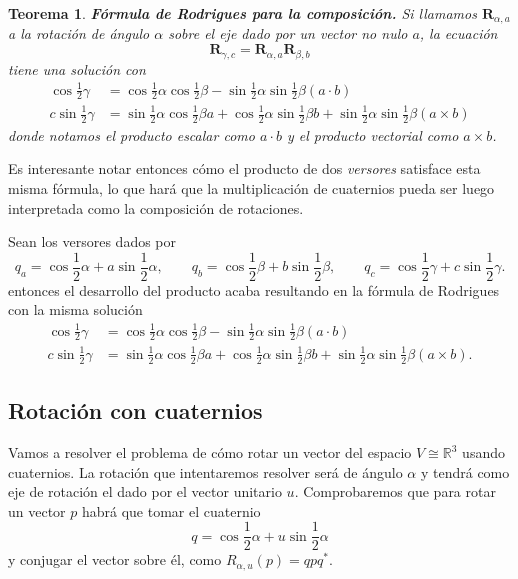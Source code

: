 \documentclass{article}
\theoremstyle{plain}
\newtheorem{theorem}{Teorema}
\theoremstyle{definition}
\theoremstyle{remark}
\begin{document}
\begin{theorem}
  \textbf{Fórmula de Rodrigues para la composición.} Si llamamos
  $\mathbf{R}_{\alpha,a}$ a la rotación de ángulo $\alpha$ sobre el
  eje dado por un vector no nulo $a$, la ecuación
  \[\mathbf{R}_{\gamma,c} =\mathbf{R}_{\alpha,a}\mathbf{R}_{\beta,b}\]
  tiene una solución con
  \[\begin{aligned}
    \cos \frac{1}{2}\gamma &=
    \cos \frac{1}{2}\alpha \cos\frac{1}{2}\beta - \sin\frac{1}{2}\alpha\sin\frac{1}{2}\beta (a\cdot b)\\
    c \sin \frac{1}{2}\gamma &=
    \sin \frac{1}{2}\alpha \cos\frac{1}{2}\beta a +
    \cos \frac{1}{2}\alpha \sin\frac{1}{2}\beta b +
    \sin \frac{1}{2}\alpha \sin\frac{1}{2}\beta (a \times b)
  \end{aligned}\]
  donde notamos el producto escalar como $a\cdot b$ y el producto vectorial como $a \times b$.
  \cite{vince11}
\end{theorem}

Es interesante notar entonces cómo el producto de dos \textit{versores}
satisface esta misma fórmula, lo que hará que la multiplicación de
cuaternios pueda ser luego interpretada como la composición de
rotaciones.

Sean los versores dados por
\[
  q_a = \cos \frac{1}{2} \alpha + a \sin \frac{1}{2} \alpha,
  \qquad
  q_b = \cos \frac{1}{2} \beta + b \sin \frac{1}{2} \beta,
  \qquad
  q_c = \cos \frac{1}{2} \gamma + c \sin \frac{1}{2} \gamma.
\]
entonces el desarrollo del producto acaba resultando en la fórmula de
Rodrigues con la misma solución
\[\begin{aligned}
    \cos \frac{1}{2}\gamma &=
    \cos \frac{1}{2}\alpha \cos\frac{1}{2}\beta - \sin\frac{1}{2}\alpha\sin\frac{1}{2}\beta (a\cdot b)\\
    c\sin \frac{1}{2}\gamma &=
    \sin \frac{1}{2}\alpha \cos\frac{1}{2}\beta a +
    \cos \frac{1}{2}\alpha \sin\frac{1}{2}\beta b +
    \sin \frac{1}{2}\alpha \sin\frac{1}{2}\beta (a \times b).
  \end{aligned}\]

\subsection{Rotación con cuaternios}
Vamos a resolver el problema de cómo rotar un vector del espacio
$V \cong \mathbb{R}^3$ usando cuaternios. La rotación que intentaremos
resolver será de ángulo $\alpha$ y tendrá como eje de rotación el dado
por el vector unitario $u$. Comprobaremos que para rotar un vector $p$
habrá que tomar el cuaternio
\[q = \cos \frac{1}{2}\alpha + u \sin \frac{1}{2}\alpha\]
y conjugar el vector sobre él, como $R_{\alpha,u}(p) = qpq^\ast $.
\end{document}
